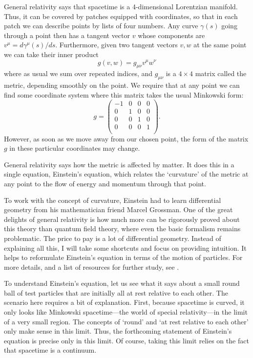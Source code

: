 \documentclass{article}
\begin{document}
General relativity says that spacetime is a 4-dimensional Lorentzian manifold. Thus, it can be covered by patches equipped with coordinates, so that in each patch we can describe points by lists of four numbers.  Any curve $\gamma(s)$ going through a point then has a tangent vector $v$ whose components are $v^\mu = d \gamma^\mu(s)/ds$.    Furthermore, given two tangent vectors $v,w$ at the same point we 
can take their inner product
\[       g(v,w) = g_{\mu \nu} v^\mu w^\nu  \]
where as usual we sum over repeated indices, and $g_{\mu \nu}$ is a $4 \times 4$ matrix called the metric, depending smoothly on the point.    We require that at any point we can find some coordinate system where this matrix takes the usual Minkowski form:
\[   g =  \left( \begin{array}{cccc} 
                 -1 & 0 &0 & 0  \\ 
                 0     & 1 &0 & 0  \\
                 0     & 0 &1 & 0  \\
                 0     & 0 &0 & 1  \\
\end{array}\right).
\]
However, as soon as we move away from our chosen point, the form of the matrix $g$ in these particular coordinates may change.   

General relativity says how the metric is affected by matter.   It does this in a single equation, Einstein's equation, which relates the `curvature' of the metric at any point to the flow of energy and momentum through that point.   

To work with the concept of curvature, Einstein had to learn differential geometry from his mathematician friend Marcel Grossman.    One of the great delights of general relativity is how much more can be rigorously proved about this theory than quantum field theory, where even the basic formalism remains problematic.  The price to pay is a lot of differential geometry.   Instead of explaining all this, I will take some shortcuts and focus on providing intuition.    It helps to reformulate Einstein's equation in terms of the motion of particles.  For more details, and a list of resources for further study, see \cite{BaezBunn}.

To understand Einstein's equation, let us see what it says about a small round ball of test particles that are initially all at rest relative to each other.   The scenario here requires a bit of explanation.   First, because spacetime is curved, it only looks like Minkowski spacetime---the world of special relativity---in the limit of a very small region.   The concepts of `round' and `at rest relative to each other' only make sense in this limit.  Thus, the forthcoming statement of Einstein's equation is precise only in this limit.  Of course, taking this limit relies on the fact that spacetime is a continuum.
\end{document}
